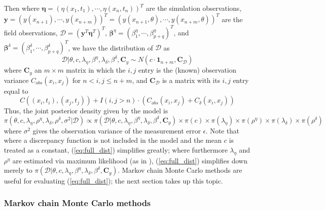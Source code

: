 \documentclass{article}
\begin{document}
Then where $\boldsymbol \eta = (\eta(x_1,t_1),\cdots,\eta(x_n,t_n))^T$ are the simulation observations, $\mathbf y = (y(x_{n+1}),\cdots,y(x_{n+m}))^T= (y(x_{n+1},\theta),\cdots,y(x_{n+m},\theta))^T$ are the field observations, $\mathcal D = (\mathbf y^T \boldsymbol \eta^T)^T$, $\boldsymbol \beta^\eta = (\beta^\eta_1,\cdots,\beta_{p+q}^\eta)^T$, and $\boldsymbol \beta^\delta = (\beta^\delta_1,\cdots,\beta_{p+q}^\delta)^T$, we have the distribution of $\mathcal D$ as
\begin{equation}
\mathcal D | \theta,c,\lambda_\eta, \beta^\eta,\lambda_\delta,\beta^\delta,\mathbf C_y \sim N(c \cdot \mathbf 1_{n+m}, \mathbf C_{\mathcal D})
\end{equation}
where $\mathbf C_y$ an $m\times m$ matrix in which the $i,j$ entry is the (known) observation variance $C_{obs}(x_i,x_j)$ for $n<i,j\leq n+m$, and $\mathbf C_{\mathcal D}$ is a matrix with its $i,j$ entry equal to
\begin{equation}
C((x_i,t_i),(x_j,t_j)) + I(i,j>n)\cdot(C_{obs}(x_i,x_j) + C_\delta(x_i,x_j))
\end{equation}
Thus, the joint posterior density given by the model is
\begin{equation} \label{eq:full_dist}
\pi(\theta,c,\lambda_\eta,\rho^\eta,\lambda_\delta,\rho^\delta,\sigma^2|\mathcal D)
\propto \pi(\mathcal D | \theta,c,\lambda_\eta, \beta^\eta,\lambda_\delta,\beta^\delta,\mathbf C_y) \times \pi(c) \times \pi(\lambda_\eta) \times 
\pi(\rho^\eta) \times \pi(\lambda_\delta) \times \pi(\rho^\delta)
\end{equation}
where $\sigma^2$ gives the observation variance of the measurement error $\epsilon$. Note that where a discrepancy function is not included in the model and the mean $c$ is treated as a constant, (\ref{eq:full_dist}) simplifies greatly; where furthermore $\lambda_\eta$ and $\rho^\eta$ are estimated via maximum likelihood (as in  \cite{Kennedy2001}),  (\ref{eq:full_dist}) simplifies down merely to 
$\pi(\mathcal D | \theta,c,\lambda_\eta, \beta^\eta,\lambda_\delta,\beta^\delta,\mathbf C_y)$. Markov chain Monte Carlo methods are useful for evaluating (\ref{eq:full_dist}); the next section takes up this topic.

\subsubsection{Markov chain Monte Carlo methods}\label{MCMC_methods}

\end{document}
